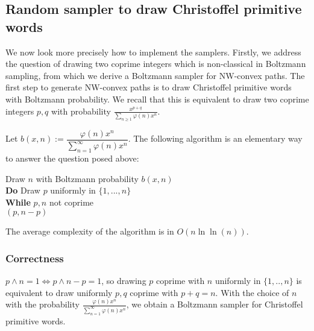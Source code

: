 \documentclass{article}
\begin{document}
\subsection{Random sampler to draw Christoffel primitive words}
We now look more precisely how to implement the samplers.
 Firstly,
we address the question  of drawing two coprime integers which
is non-classical in Boltzmann sampling, from which we derive a Boltzmann sampler for NW-convex paths.
The first step to generate NW-convex paths is to draw Christoffel primitive words with Boltzmann probability.
We recall that this is equivalent to draw two coprime integers $p,q$ with probability $\frac{x^{p+q}}{\sum_{n\geq 1}\varphi(n) x^n}$.

Let $b(x,n):=\dfrac{\varphi (n)
x^{n}}{\sum\limits_{n=1}^{\infty}{\varphi (n) x^n}}$. The
following algorithm is an elementary way to answer the question
posed above:

\begin{algorithm}[H]
\caption{$\Gamma_{CP} $}
\label{gammaCP}

Draw $n$ with Boltzmann probability $b(x,n)$\\

\textbf{Do} Draw $p$ uniformly in $\{1,...,n\}$\\
\textbf{While} $p, n$ not coprime\\
\Return $(p, n-p)$\\
\end{algorithm}
The average complexity of the algorithm is in $O(n\ln \ln
(n))$. 

 \subsubsection{Correctness}
$p \wedge n =1 \Leftrightarrow p \wedge n-p=1$, so drawing $p$ coprime with $n$ uniformly in $\{1,..,n\}$ is equivalent to draw uniformly $p,q$ coprime with $p+q=n$.
With the choice of $n$ with the probability $\frac{\varphi (n) x^{n}}{\sum\limits_{n=1}^{\infty}{\varphi (n) x^n}}$, we obtain a Boltzmann sampler for Christoffel primitive words.
\end{document}
